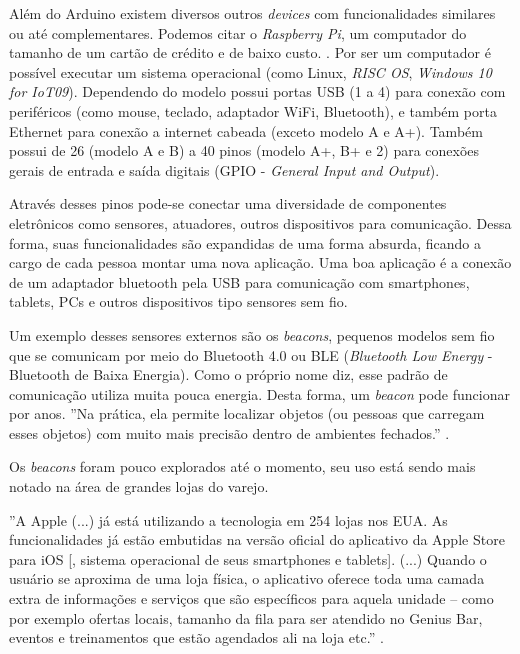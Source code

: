 \documentclass[
		12pt,				%
		openright,			%
		oneside,			%
		a4paper,			%
		chapter=TITLE,		%
		english,			%
		brazil				%
	]{abntex2}
\begin{document}
Além do Arduino existem diversos outros \textit{devices} com funcionalidades similares ou até complementares. Podemos citar o \textit{Raspberry Pi}, um computador do tamanho de um cartão de crédito e de baixo custo. \cite{raspberrypi-rpi}. Por ser um computador é possível executar um sistema operacional (como Linux, \textit{RISC OS}, \textit{Windows 10 for IoT09}). Dependendo do modelo possui portas USB (1 a 4) para conexão com periféricos (como mouse, teclado, adaptador WiFi, Bluetooth), e também porta Ethernet para conexão a internet cabeada (exceto modelo A e A+). Também possui de 26 (modelo A e B) a 40 pinos (modelo A+, B+ e 2) para conexões gerais de entrada e saída digitais (GPIO - \textit{General Input and Output}). 

Através desses pinos pode-se conectar uma diversidade de componentes eletrônicos como sensores, atuadores, outros dispositivos para comunicação. Dessa forma, suas funcionalidades são expandidas de uma forma absurda, ficando a cargo de cada pessoa montar uma nova aplicação. Uma boa aplicação é a conexão de um adaptador bluetooth pela USB para comunicação com smartphones, tablets, PCs e outros dispositivos tipo sensores sem fio.

Um exemplo desses sensores externos são os \textit{beacons}, pequenos modelos sem fio que se comunicam por meio do Bluetooth 4.0 ou BLE (\textit{Bluetooth Low Energy} - Bluetooth de Baixa Energia). Como o próprio nome diz, esse padrão de comunicação utiliza muita pouca energia. Desta forma, um \textit{beacon} pode funcionar por anos. ''Na prática, ela permite localizar objetos (ou pessoas que carregam esses objetos) com muito mais precisão dentro de ambientes fechados.'' \cite{teixeira-beacon}.

Os \textit{beacons} foram pouco explorados até o momento, seu uso está sendo mais notado na área de grandes lojas do varejo.

\begin{citacao}
''A Apple (...) já está utilizando a tecnologia em 254 lojas nos EUA. As funcionalidades já estão embutidas na versão oficial do aplicativo da Apple Store para iOS [, sistema operacional de seus smartphones e tablets]. (...) Quando o usuário se aproxima de uma loja física, o aplicativo oferece toda uma camada extra de informações e serviços que são específicos para aquela unidade – como por exemplo ofertas locais, tamanho da fila para ser atendido no Genius Bar, eventos e treinamentos que estão agendados ali na loja etc.'' \cite{teixeira-beacon}.
\end{citacao}
\end{document}
